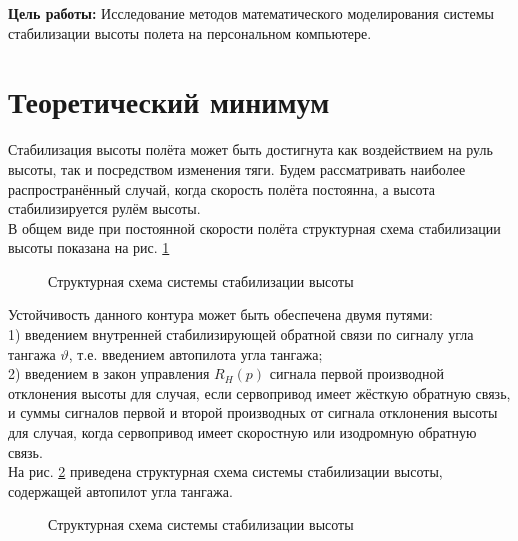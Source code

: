 \textbf{Цель работы:} Исследование методов математического моделирования системы стабилизации высоты полета на персональном компьютере.
\section{Теоретический минимум}
Стабилизация высоты полёта может быть достигнута как воздействием на руль высоты, так и посредством изменения тяги. Будем рассматривать наиболее распространённый случай, 
когда скорость полёта постоянна, а высота стабилизируется рулём высоты.\\
В общем виде при постоянной скорости полёта структурная схема стабилизации высоты показана 
на рис. \ref{fig:1}

\begin{figure}[H]
    \caption{Структурная схема системы стабилизации высоты}
    \label{fig:1}
\end{figure}
 
Устойчивость данного контура может быть обеспечена двумя путями: \\ 

1) введением внутренней стабилизирующей обратной связи по сигналу угла тангажа 
$\vartheta$, т.е. введением автопилота угла тангажа;\\

2) введением в закон управления $R_{H}(p)$ сигнала первой производной отклонения высоты для случая, если сервопривод имеет жёсткую обратную связь,
и суммы сигналов первой и второй производных от сигнала отклонения высоты для случая, 
когда сервопривод имеет скоростную или изодромную обратную связь.\\

На рис. \ref{fig:2} приведена структурная схема системы стабилизации высоты, содержащей автопилот угла тангажа.

\begin{figure}[H]
    \caption{Структурная схема системы стабилизации высоты}
    \label{fig:2}
\end{figure}

